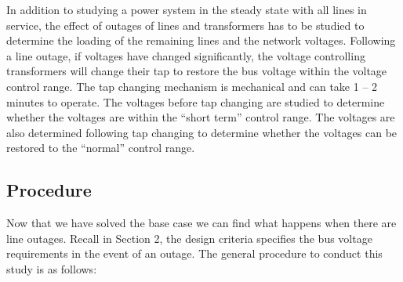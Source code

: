 \documentclass[paper=a4, fontsize=11pt]{article}
\begin{document}
In addition to studying a power system in the steady state with all lines in service, the effect of outages of lines and transformers has to be studied to determine the loading of the remaining lines and the network voltages.  Following a line outage, if voltages have changed significantly, the voltage controlling transformers will change 	their tap to restore the bus voltage within the voltage control range. The tap changing mechanism is mechanical and can take 1 -- 2 minutes to operate.  The voltages before tap changing are studied to determine whether the voltages are within the ``short term'' control range. The voltages are also determined following tap changing to determine whether the voltages can be restored to the ``normal'' control 	range.

\subsection{Procedure}
Now that we have solved the base case we can find what happens when there are line outages. Recall in Section 2, the design criteria specifies the bus voltage requirements in the event of an outage. The general procedure to conduct this study is as follows:
\end{document}

